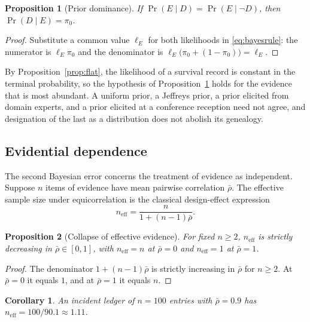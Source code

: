 \documentclass[11pt]{article}
\newtheorem{proposition}{Proposition}[section]
\newtheorem{corollary}{Corollary}[section]
\theoremstyle{remark}
\newcommand{\rhobar}{\bar{\rho}}
\begin{document}
\begin{proposition}[Prior dominance]\label{prop:priordom}
If $\Pr(E\mid D)=\Pr(E\mid\neg D)$, then $\Pr(D\mid E)=\pi_0$.
\end{proposition}
\begin{proof}
Substitute a common value $\ell_E$ for both likelihoods in \eqref{eq:bayesrule}: the numerator is $\ell_E\pi_0$ and the denominator is $\ell_E\bigl(\pi_0+(1-\pi_0)\bigr)=\ell_E$. \qedhere
\end{proof}

By Proposition~\ref{prop:flat}, the likelihood of a survival record is constant in the terminal probability, so the hypothesis of Proposition~\ref{prop:priordom} holds for the evidence that is most abundant. A uniform prior, a Jeffreys prior, a prior elicited from domain experts, and a prior elicited at a conference reception need not agree, and designation of the last as a distribution does not abolish its genealogy.

\subsection{Evidential dependence}

The second Bayesian error concerns the treatment of evidence as independent. Suppose $n$ items of evidence have mean pairwise correlation $\rhobar$. The effective sample size under equicorrelation is the classical design-effect expression \cite{kish1965}
\begin{equation}\label{eq:neff}
n_{\mathrm{eff}}=\frac{n}{1+(n-1)\rhobar}.
\end{equation}

\begin{proposition}[Collapse of effective evidence]\label{prop:collapse}
For fixed $n\ge 2$, $n_{\mathrm{eff}}$ is strictly decreasing in $\rhobar\in[0,1]$, with $n_{\mathrm{eff}}=n$ at $\rhobar=0$ and $n_{\mathrm{eff}}=1$ at $\rhobar=1$.
\end{proposition}
\begin{proof}
The denominator $1+(n-1)\rhobar$ is strictly increasing in $\rhobar$ for $n\ge 2$. At $\rhobar=0$ it equals $1$, and at $\rhobar=1$ it equals $n$. \qedhere
\end{proof}

\begin{corollary}
An incident ledger of $n=100$ entries with $\rhobar=0.9$ has $n_{\mathrm{eff}}=100/90.1\approx 1.11$.
\end{corollary}
\end{document}
